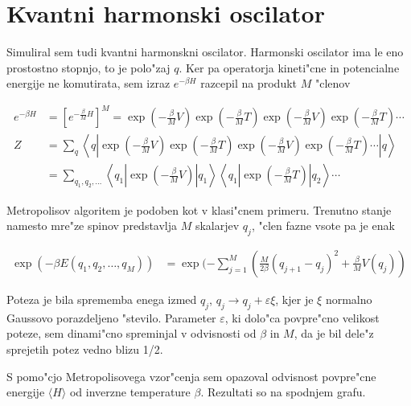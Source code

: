 \documentclass[a4paper,10pt]{article}
\begin{document}
\section{Kvantni harmonski oscilator}

Simuliral sem tudi kvantni harmonskni oscilator. 
Harmonski oscilator ima le eno prostostno stopnjo, to je polo"zaj $q$. 
Ker pa operatorja kineti"cne in potencialne energije ne komutirata, sem izraz $e^{-\beta H}$ razcepil na produkt $M$ "clenov

\begin{align}
 e^{-\beta H} &= \left[e^{-\frac{\beta}{M}H}\right]^M = \exp\left(-{\frac{\beta}{M}V}\right) \exp\left(-{\frac{\beta}{M}T}\right) \exp\left(-{\frac{\beta}{M}V}\right) \exp\left(-{\frac{\beta}{M}T}\right) \cdots \\
 Z &= \sum_{q} \left\langle q \left|\exp\left(-{\frac{\beta}{M}V}\right) \exp\left(-{\frac{\beta}{M}T}\right) \exp\left(-{\frac{\beta}{M}V}\right) \exp\left(-{\frac{\beta}{M}T}\right) \cdots \right| q \right\rangle \\
 &= \sum_{q_1, q_2, \ldots} \left\langle q_1 \left|\exp\left(-{\frac{\beta}{M}V}\right) \right|q_1\right\rangle \left\langle q_1 \left| \exp\left(-{\frac{\beta}{M}T}\right) \right|q_2\right\rangle \cdots
\end{align}


Metropolisov algoritem je podoben kot v klasi"cnem primeru.
Trenutno stanje namesto mre"ze spinov predstavlja $M$ skalarjev $q_j$, "clen fazne vsote pa je enak

\begin{align}
 \exp\left(-\beta E(q_1, q_2, \ldots, q_M)\right) &= \exp(-\sum_{j=1}^M \left( \frac{M}{2\beta} (q_{j+1} - q_j)^2 + \frac{\beta}{M} V(q_j) \right)
\end{align}

Poteza je bila sprememba enega izmed $q_j$, $q_j \to q_j + \varepsilon \xi$, kjer je $\xi$ normalno Gaussovo porazdeljeno "stevilo. 
Parameter $\varepsilon$, ki dolo"ca povpre"cno velikost poteze, sem dinami"cno spreminjal v odvisnosti od $\beta$ in $M$, da je bil dele"z sprejetih potez vedno blizu 1/2. 

S pomo"cjo Metropolisovega vzor"cenja sem opazoval odvisnost povpre"cne energije $\langle H \rangle$ od inverzne temperature $\beta$. 
Rezultati so na spodnjem grafu. 

\begin{figure}[H]
 \centering
 
\end{figure}
\end{document}
